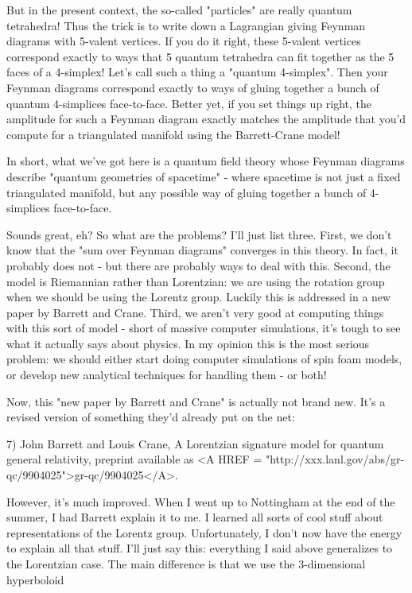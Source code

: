 But in the present context, the so-called "particles" are
really quantum tetrahedra!  Thus the trick is to write down a Lagrangian
giving Feynman diagrams with 5-valent vertices.  If you do it right,
these 5-valent vertices correspond exactly to ways that 5 quantum
tetrahedra can fit together as the 5 faces of a 4-simplex!  Let's call
such a thing a "quantum 4-simplex".  Then your Feynman
diagrams correspond exactly to ways of gluing together a bunch of
quantum 4-simplices face-to-face.  Better yet, if you set things up
right, the amplitude for such a Feynman diagram exactly matches the
amplitude that you'd compute for a triangulated manifold using the
Barrett-Crane model!

In short, what we've got here is a quantum field theory whose Feynman
diagrams describe "quantum geometries of spacetime" - where spacetime
is not just a fixed triangulated manifold, but any possible way of 
gluing together a bunch of 4-simplices face-to-face.  

Sounds great, eh?  So what are the problems?  I'll just list three.
First, we don't know that the "sum over Feynman diagrams"
converges in this theory.  In fact, it probably does not - but there are
probably ways to deal with this.  Second, the model is Riemannian rather
than Lorentzian: we are using the rotation group when we should be using
the Lorentz group.  Luckily this is addressed in a new paper by Barrett
and Crane.  Third, we aren't very good at computing things with this
sort of model - short of massive computer simulations, it's tough to see
what it actually says about physics.  In my opinion this is the most
serious problem: we should either start doing computer simulations of
spin foam models, or develop new analytical techniques for handling them
- or both!

Now, this "new paper by Barrett and Crane" is actually not brand new.
It's a revised version of something they'd already put on the net:

7) John Barrett and Louis Crane, A Lorentzian signature model for
quantum general relativity, preprint available as <A HREF = "http://xxx.lanl.gov/abs/gr-qc/9904025">gr-qc/9904025</A>.

However, it's much improved.  When I went up to Nottingham at the end of
the summer, I had Barrett explain it to me.  I learned all sorts of cool
stuff about representations of the Lorentz group.  Unfortunately, I
don't now have the energy to explain all that stuff.   I'll just say
this: everything I said above generalizes to the Lorentzian case.  The
main difference is that we use the 3-dimensional hyperboloid

